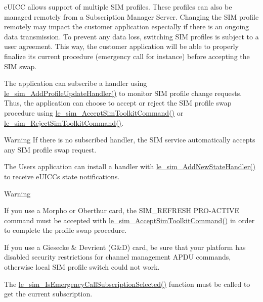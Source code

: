 e\+U\+I\+CC allows support of multiple S\+IM profiles. These profiles can also be managed remotely from a Subscription Manager Server. Changing the S\+IM profile remotely may impact the customer application especially if there is an ongoing data transmission. To prevent any data loss, switching S\+IM profiles is subject to a user agreement. This way, the customer application will be able to properly finalize its current procedure (emergency call for instance) before accepting the S\+IM swap.

The application can subscribe a handler using \hyperlink{le__sim__interface_8h_a94458aae91c311867bd8b3960c507aef}{le\+\_\+sim\+\_\+\+Add\+Profile\+Update\+Handler()} to monitor S\+IM profile change requests. Thus, the application can choose to accept or reject the S\+IM profile swap procedure using \hyperlink{le__sim__interface_8h_a8cc75a17466446c19c5bd941b1360e0e}{le\+\_\+sim\+\_\+\+Accept\+Sim\+Toolkit\+Command()} or \hyperlink{le__sim__interface_8h_a8cbdc50d62ddd5ea80386d27e16d954f}{le\+\_\+sim\+\_\+\+Reject\+Sim\+Toolkit\+Command()}.

\begin{DoxyWarning}{Warning}
If there is no subscribed handler, the S\+IM service automatically accepts any S\+IM profile swap request.
\end{DoxyWarning}
The User\textquotesingle{}s application can install a handler with \hyperlink{le__sim__interface_8h_a8e296a7cd35edd99cb1dc21232e280dd}{le\+\_\+sim\+\_\+\+Add\+New\+State\+Handler()} to receive e\+U\+I\+CC\textquotesingle{}s state notifications.

\begin{DoxyWarning}{Warning}

\begin{DoxyItemize}
\item If you use a Morpho or Oberthur card, the S\+I\+M\+\_\+\+R\+E\+F\+R\+E\+SH P\+R\+O-\/\+A\+C\+T\+I\+VE command must be accepted with \hyperlink{le__sim__interface_8h_a8cc75a17466446c19c5bd941b1360e0e}{le\+\_\+sim\+\_\+\+Accept\+Sim\+Toolkit\+Command()} in order to complete the profile swap procedure.
\item If you use a Giesecke \& Devrient (G\&D) card, be sure that your platform has disabled security restrictions for channel management A\+P\+DU commands, otherwise local S\+IM profile switch could not work.
\end{DoxyItemize}
\end{DoxyWarning}
The \hyperlink{le__sim__interface_8h_a837cdc0fe30761f4339f846a0b44c5f1}{le\+\_\+sim\+\_\+\+Is\+Emergency\+Call\+Subscription\+Selected()} function must be called to get the current subscription.

